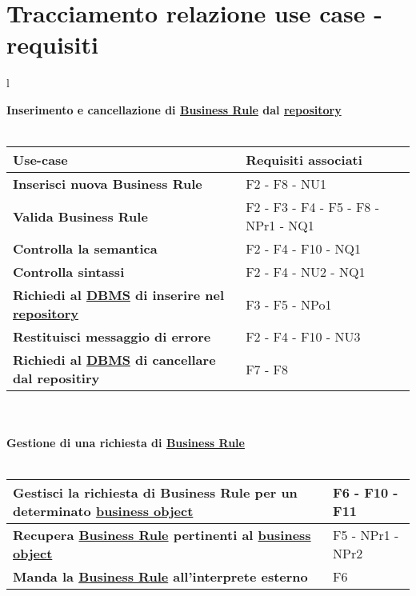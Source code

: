 \section{Tracciamento relazione use case - requisiti}
\large{
\begin{tabular}{l}

\textbf{Inserimento e cancellazione di \underline{Business Rule} dal \underline{repository}}\\ \\

\begin{tabular}{||p{8cm}||p{4cm}||} \hline
\textbf{Use-case} & \textbf{Requisiti associati} \\ \hline
\textbf{Inserisci nuova Business Rule} & F2 - F8 - NU1 \\ \hline
\textbf{Valida Business Rule} & F2 - F3 - F4 - F5 - F8 - NPr1 - NQ1 \\ \hline
\textbf{Controlla la semantica} & F2 - F4 - F10 - NQ1\\ \hline
\textbf{Controlla sintassi} & F2 - F4 - NU2 - NQ1\\ \hline
\textbf{Richiedi al \underline{DBMS} di inserire nel \underline{repository}} & F3 -  F5 -  NPo1 \\ \hline
\textbf{Restituisci messaggio di errore} & F2 - F4 - F10 - NU3 \\ \hline
\textbf{Richiedi al \underline{DBMS} di cancellare dal repositiry} & F7 - F8 \\ \hline
\end{tabular} \\ \\

\textbf {Gestione di una richiesta di \underline{Business Rule}}\\ \\

\begin{tabular}{||p{8cm}||p{4cm}||} \hline
\textbf{Gestisci la richiesta di Business Rule per un determinato \underline{business object}} & F6 - F10 - F11 \\ \hline
\textbf{Recupera \underline{Business Rule} pertinenti al \underline{business object}} & F5 - NPr1 - NPr2 \\ \hline
\textbf{Manda la \underline{Business Rule} all'interprete esterno} & F6 \\ \hline
\end{tabular} \\
\end{tabular}
}

